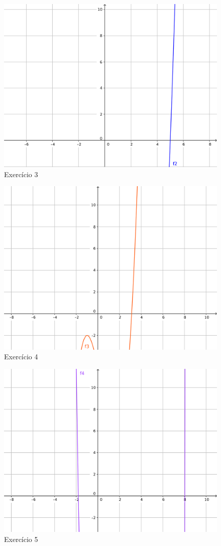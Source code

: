 \documentclass[a4paper, 12pt]{article}
\begin{document}
\begin{enumerate}
    \begin{figure}[h!]
    \centering
    \includegraphics[width=120mm]{img3.png}
    \caption{Exercício 3}
    \end{figure}

    \begin{figure}[h!]
    \centering
    \includegraphics[width=120mm]{img4.png}
    \caption{Exercício 4}
    \end{figure}

    \begin{figure}[h!]
    \centering
    \includegraphics[width=120mm]{img5.png}
    \caption{Exercício 5}
    \end{figure}

\end{enumerate}
\end{document}
